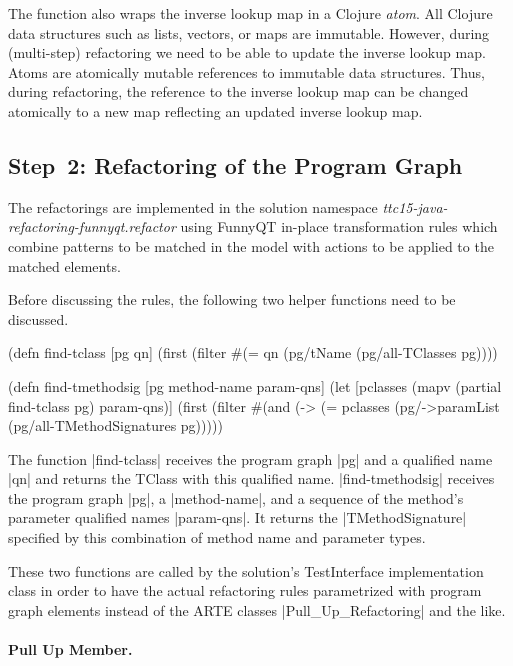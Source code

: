 \documentclass[submission]{eptcs}
\newcommand{\code}{\clojureinline}
\begin{document}
The function also wraps the inverse lookup map in a Clojure \emph{atom}.  All
Clojure data structures such as lists, vectors, or maps are immutable.
However, during (multi-step) refactoring we need to be able to update the
inverse lookup map.  Atoms are atomically mutable references to immutable data
structures.  Thus, during refactoring, the reference to the inverse lookup map
can be changed atomically to a new map reflecting an updated inverse lookup
map.


\subsection{Step~2: Refactoring of the Program Graph}
\label{sec:step-2:refactoring-pg}

The refactorings are implemented in the solution namespace
\emph{ttc15-java-refactoring-funnyqt.refactor} using FunnyQT in-place
transformation rules which combine patterns to be matched in the model with
actions to be applied to the matched elements.

Before discussing the rules, the following two helper functions need to be
discussed.

\begin{clojurecode}
(defn find-tclass [pg qn]
  (first (filter #(= qn (pg/tName %
                 (pg/all-TClasses pg))))

(defn find-tmethodsig [pg method-name param-qns]
  (let [pclasses (mapv (partial find-tclass pg) param-qns)]
    (first (filter #(and (-> %
                         (= pclasses (pg/->paramList %
                   (pg/all-TMethodSignatures pg)))))
\end{clojurecode}

The function \code|find-tclass| receives the program graph \code|pg| and a
qualified name \code|qn| and returns the \textsf{TClass} with this qualified
name.  \code|find-tmethodsig| receives the program graph \code|pg|, a
\code|method-name|, and a sequence of the method's parameter qualified names
\code|param-qns|.  It returns the \code|TMethodSignature| specified by this
combination of method name and parameter types.

These two functions are called by the solution's \textsf{TestInterface}
implementation class in order to have the actual refactoring rules parametrized
with program graph elements instead of the ARTE classes
\code|Pull_Up_Refactoring| and the like.


\paragraph{Pull Up Member.}
\end{document}

